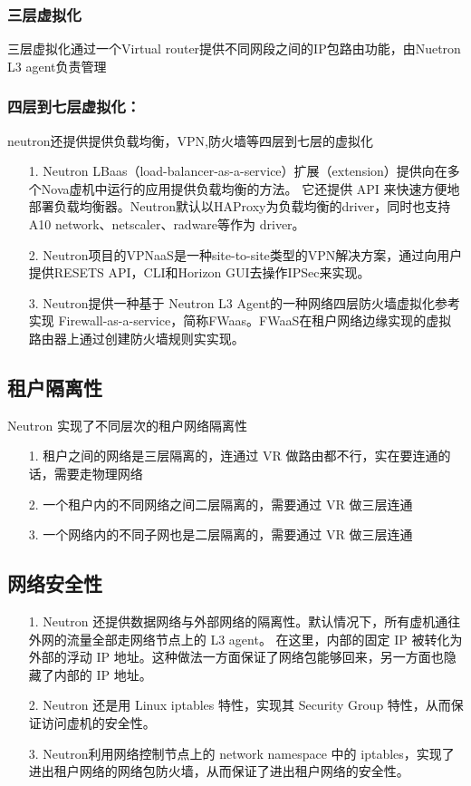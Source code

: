 \documentclass[a4paper,left=1.5cm,right=1.5cm,11pt]{article}
\begin{document}
\subsubsection{三层虚拟化}
三层虚拟化通过一个Virtual router提供不同网段之间的IP包路由功能，由Nuetron L3 agent负责管理
\subsubsection{四层到七层虚拟化：}
neutron还提供提供负载均衡，VPN,防火墙等四层到七层的虚拟化
\begin{itemize}
	\item[1.]Neutron LBaas（load-balancer-as-a-service）扩展（extension）提供向在多个Nova虚机中运行的应用提供负载均衡的方法。
	它还提供 API 来快速方便地部署负载均衡器。Neutron默认以HAProxy为负载均衡的driver，同时也支持 A10 network、netscaler、radware等作为 driver。
	\item[2.]Neutron项目的VPNaaS是一种site-to-site类型的VPN解决方案，通过向用户提供RESETS API，CLI和Horizon GUI去操作IPSec来实现。
	\item[3.]Neutron提供一种基于 Neutron L3 Agent的一种网络四层防火墙虚拟化参考实现 Firewall-as-a-service，简称FWaas。FWaaS在租户网络边缘实现的虚拟路由器上通过创建防火墙规则实实现。
\end{itemize}
\subsection{租户隔离性}
Neutron 实现了不同层次的租户网络隔离性
\begin{itemize}
	\item[1.]租户之间的网络是三层隔离的，连通过 VR 做路由都不行，实在要连通的话，需要走物理网络
	\item[2.]一个租户内的不同网络之间二层隔离的，需要通过 VR 做三层连通
	\item[3.]一个网络内的不同子网也是二层隔离的，需要通过 VR 做三层连通
\end{itemize}
\subsection{网络安全性}
\begin{itemize}
	\item[1.]Neutron 还提供数据网络与外部网络的隔离性。默认情况下，所有虚机通往外网的流量全部走网络节点上的 L3 agent。
	在这里，内部的固定 IP 被转化为外部的浮动 IP 地址。这种做法一方面保证了网络包能够回来，另一方面也隐藏了内部的 IP 地址。
	\item[2.]Neutron 还是用 Linux iptables 特性，实现其 Security Group 特性，从而保证访问虚机的安全性。
	\item[3.]Neutron利用网络控制节点上的 network namespace 中的 iptables，实现了进出租户网络的网络包防火墙，从而保证了进出租户网络的安全性。
\end{itemize}
\end{document}
